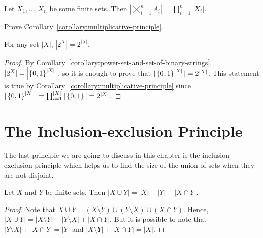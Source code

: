 \begin{corollary}
\label{corollary:multiplicative-principle}
  Let $X_1, \dots, X_n$ be some finite sets. Then
  $\left|\bigtimes_{i = 1}^n A_i\right| = \prod_{i = 1}^n |X_i|$.
\end{corollary}

\begin{exercise}
  Prove Corollary~\ref{corollary:multiplicative-principle}.
\end{exercise}

\begin{theorem}
\label{theorem:cardinality-of-power-set}
  For any set $|X|$, $|2^X| = 2^{|X|}$.
\end{theorem}
\begin{proof}
  By Corollary~\ref{corollary:power-set-and-set-of-binary-strings}, $|2^X| =
  \left|\set{0, 1}^{|X|}\right|$, so it is enough to prove that
  $|\set{0, 1}^{|X|}| = 2^{|X|}$. This statement is true by
  Corollary~\ref{corollary:multiplicative-principle} since $|\set{0, 1}^{|X|}| =
  \prod_{i = 1}^{|X|} |\set{0, 1}| = 2^{|X|}$.
\end{proof}

\section{The Inclusion-exclusion Principle}

The last principle we are going to discuss in this chapter is the
inclusion-exclusion principle which helps us to find the size of the union
of sets when they are not disjoint.
\begin{theorem}
\label{theorem:inclusion-exclusion-principle}
  Let $X$ and $Y$ be finite sets. Then $|X \cup Y| = |X| + |Y| - |X \cap Y|$.
\end{theorem}
\begin{proof}
  Note that $X \cup Y = (X \setminus Y) \cup (Y \setminus X) \cup (X \cap Y)$.
  Hence, $|X \cup Y| = |X \setminus Y| + |Y \setminus X| + |X \cap Y|$. But it
  is possible to note that $|Y \setminus X| + |X \cap Y| = |Y|$ and
  $|X \setminus Y| + |X \cap Y| = |X|$.
\end{proof}

